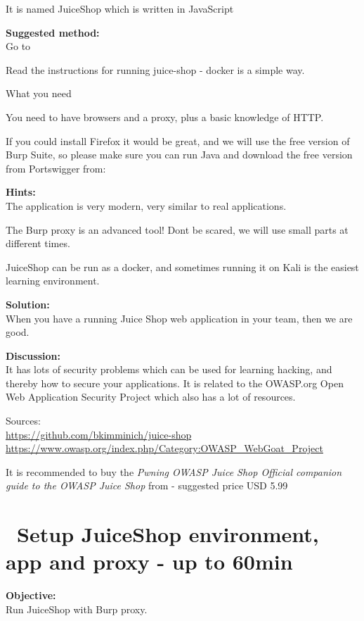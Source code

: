 \documentclass[a4paper,11pt,notitlepage]{report}
\begin{document}
It is named JuiceShop which is written in JavaScript

{\bf Suggested method:}\\
Go to 

Read the instructions for running juice-shop - docker is a simple way.

What you need

You need to have browsers and a proxy, plus a basic knowledge of HTTP.

If you could install Firefox it would be great, and we will use the
free version of Burp Suite, so please make sure you can run Java and
download the free version from Portswigger from:



{\bf Hints:}\\
The application is very modern, very similar to real applications.

The Burp proxy is an advanced tool! Dont be scared, we will use small parts at different times.

JuiceShop can be run as a docker, and sometimes running it on Kali is the easiest learning environment.

{\bf Solution:}\\
When you have a running Juice Shop web application in your team, then we are good.

{\bf Discussion:}\\
It has lots of security problems which can be used for learning
hacking, and thereby how to secure your applications. It is  related
to the OWASP.org Open Web Application Security Project which also has a
lot of resources.

Sources:\\
\url{https://github.com/bkimminich/juice-shop}\\
\url{https://www.owasp.org/index.php/Category:OWASP_WebGoat_Project}

It is recommended to buy the \emph{Pwning OWASP Juice Shop Official companion guide to the OWASP Juice Shop} from  - suggested price USD 5.99

\chapter{\faInfoCircle\ Setup JuiceShop environment, app and proxy - up to 60min}
\label{ex:js-burp}

{\bf Objective:}\\
Run JuiceShop with Burp proxy.
\end{document}
